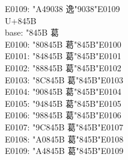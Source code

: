 \documentclass{ujarticle}
\begin{document}
\begin{multicols*}{4}
E0109: \kchar"A49038 逸󠄉\kchar"9038\kchar"E0109\\
\VS
U+845B\\
base: \kchar"845B 葛\\
E0100: \kchar"80845B 葛󠄀\kchar"845B\kchar"E0100\\
E0101: \kchar"84845B 葛󠄁\kchar"845B\kchar"E0101\\
E0102: \kchar"88845B 葛󠄂\kchar"845B\kchar"E0102\\
E0103: \kchar"8C845B 葛󠄃\kchar"845B\kchar"E0103\\
E0104: \kchar"90845B 葛󠄄\kchar"845B\kchar"E0104\\
E0105: \kchar"94845B 葛󠄅\kchar"845B\kchar"E0105\\
E0106: \kchar"98845B 葛󠄆\kchar"845B\kchar"E0106\\
E0107: \kchar"9C845B 葛󠄇\kchar"845B\kchar"E0107\\
E0108: \kchar"A0845B 葛󠄈\kchar"845B\kchar"E0108\\
E0109: \kchar"A4845B 葛󠄉\kchar"845B\kchar"E0109\\


\end{multicols*}
\end{document}
